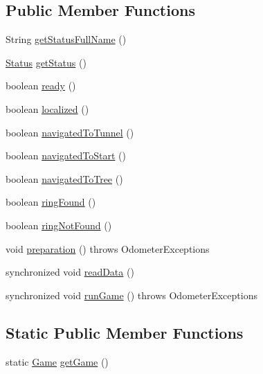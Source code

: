 \subsection*{Public Member Functions}
\begin{DoxyCompactItemize}
\item 
String \hyperlink{enumca_1_1mcgill_1_1ecse211_1_1project_1_1_game_a43a5763d183e0bcacd402c872c07273e}{get\+Status\+Full\+Name} ()
\item 
\hyperlink{enumca_1_1mcgill_1_1ecse211_1_1project_1_1_game_1_1_status}{Status} \hyperlink{enumca_1_1mcgill_1_1ecse211_1_1project_1_1_game_a620374b3eeb3dd7e0abd26f3ced9053b}{get\+Status} ()
\item 
boolean \hyperlink{enumca_1_1mcgill_1_1ecse211_1_1project_1_1_game_af0afcc3fad6172857252b89624f48e32}{ready} ()
\item 
boolean \hyperlink{enumca_1_1mcgill_1_1ecse211_1_1project_1_1_game_a6b4c0cfb8de83ba7c6d5dfb24882dc5a}{localized} ()
\item 
boolean \hyperlink{enumca_1_1mcgill_1_1ecse211_1_1project_1_1_game_affc3685219c09f0a4a75cb1ea9366c8e}{navigated\+To\+Tunnel} ()
\item 
boolean \hyperlink{enumca_1_1mcgill_1_1ecse211_1_1project_1_1_game_a5f387482790bf2c55413a6619b4d00d8}{navigated\+To\+Start} ()
\item 
boolean \hyperlink{enumca_1_1mcgill_1_1ecse211_1_1project_1_1_game_aed641f9ade50f0090096a46d90588eb7}{navigated\+To\+Tree} ()
\item 
boolean \hyperlink{enumca_1_1mcgill_1_1ecse211_1_1project_1_1_game_a62d510506f1b829fe67dea7270e5b889}{ring\+Found} ()
\item 
boolean \hyperlink{enumca_1_1mcgill_1_1ecse211_1_1project_1_1_game_adc2725f291b0688a62f85db1df1ee2b2}{ring\+Not\+Found} ()
\item 
void \hyperlink{enumca_1_1mcgill_1_1ecse211_1_1project_1_1_game_a8f3c5b18f98ee56f5f03afd72fa40bcb}{preparation} ()  throws Odometer\+Exceptions 
\item 
synchronized void \hyperlink{enumca_1_1mcgill_1_1ecse211_1_1project_1_1_game_ab28110fca0af679acdaea84025746f15}{read\+Data} ()
\item 
synchronized void \hyperlink{enumca_1_1mcgill_1_1ecse211_1_1project_1_1_game_a46cbbf56a4544524174d9d3e63fb9759}{run\+Game} ()  throws Odometer\+Exceptions 
\end{DoxyCompactItemize}
\subsection*{Static Public Member Functions}
\begin{DoxyCompactItemize}
\item 
static \hyperlink{enumca_1_1mcgill_1_1ecse211_1_1project_1_1_game}{Game} \hyperlink{enumca_1_1mcgill_1_1ecse211_1_1project_1_1_game_a52a167474d714aeaed55a877b766cf98}{get\+Game} ()
\end{DoxyCompactItemize}
